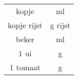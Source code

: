 \begin{tabular}{|c|c|}
    \hline
    \unit[1]{kopje} & \unit[125]{ml} \\
    \unit[1]{kopje} rijst & \unit[100]{g} rijst \\ 
    \unit[1]{beker} & \unit[180]{ml} \\
    1 ui &  \unit[75]{g} \\
    1 tomaat & \unit[70]{g} \\
    \hline
\end{tabular}